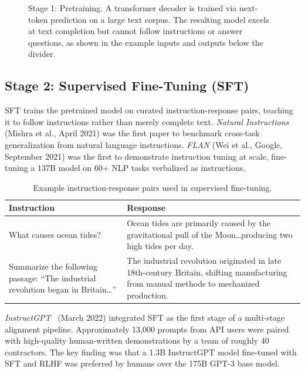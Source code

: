 \documentclass[12pt]{article}
\begin{document}
\begin{figure}[ht]
\caption{Stage 1: Pretraining. A transformer decoder is trained via next-token prediction on a large text corpus. The resulting model excels at text completion but cannot follow instructions or answer questions, as shown in the example inputs and outputs below the divider.}
\label{fig:stage1_pretraining}
\end{figure}

\subsection{Stage 2: Supervised Fine-Tuning (SFT)}

SFT trains the pretrained model on curated instruction-response pairs, teaching it to follow instructions rather than merely complete text. \textit{Natural Instructions} (Mishra et al., April 2021) was the first paper to benchmark cross-task generalization from natural language instructions. \textit{FLAN} (Wei et al., Google, September 2021) was the first to demonstrate instruction tuning at scale, fine-tuning a 137B model on 60+ NLP tasks verbalized as instructions.

\begin{table}[ht]
\centering
\caption{Example instruction-response pairs used in supervised fine-tuning.}
\label{tab:sft_examples}
\begin{tabularx}{\textwidth}{>{\raggedright\arraybackslash}p{} X}
\toprule
\textbf{Instruction} & \textbf{Response} \\
\midrule
What causes ocean tides? & Ocean tides are primarily caused by the gravitational pull of the Moon\ldots producing two high tides per day. \\
\addlinespace
Summarize the following passage: ``The industrial revolution began in Britain\ldots'' & The industrial revolution originated in late 18th-century Britain, shifting manufacturing from manual methods to mechanized production. \\
\bottomrule
\end{tabularx}
\end{table}

\textit{InstructGPT}~\cite{Ouyang2022InstructGPT} (March 2022) integrated SFT as the first stage of a multi-stage alignment pipeline. Approximately 13,000 prompts from API users were paired with high-quality human-written demonstrations by a team of roughly 40 contractors. The key finding was that a 1.3B InstructGPT model fine-tuned with SFT and RLHF was preferred by humans over the 175B GPT-3 base model.
\end{document}
